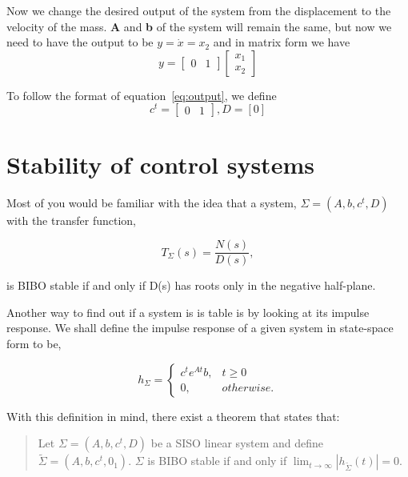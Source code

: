 \medskip Now we change the desired output of the system from the displacement to the velocity of the mass.  \textbf{A} and \textbf{b} of the system
will remain the same, but now we need to have the output to be
$y=\dot x=x_{2}$ and in matrix form we have
\begin{displaymath}
y=\left[\begin{array}{cc}0&1\end{array}\right]\left[\begin{array}{c}x_{1}\\x_{2}\end{array}\right]
\end{displaymath}

\noindent To follow the format of equation~\ref{eq:output}, we
define
\begin{displaymath}
c^{t}=\left[\begin{array}{cc}0&1\end{array}\right], D=[0]
\end{displaymath}

\section{Stability of control systems}

Most of you would be familiar with the idea that a system,
$\Sigma\mathbf=({A,b,c^{t},D})$ with the transfer function,

\begin{displaymath}
T_{\Sigma}(s)=\frac{N(s)}{D(s)},
\end{displaymath}

\noindent is BIBO stable if and only if D(s) has roots only in the
negative half-plane.

Another way to find out if a system is is table is by looking at
its impulse response.  We shall define the impulse response of a
given system in state-space form to be,

\begin{displaymath}
h_{\Sigma}= \left\{
\begin{array}{cc}c^{t}e^{At}b, &t\geq0\\0,&otherwise.\end{array}\right.
\end{displaymath}

\noindent With this definition in mind, there exist a theorem that
states that:

\begin{quote}

Let $\Sigma\mathbf=({A,b,c^{t},D})$ be a SISO linear system and
define $\tilde{\Sigma}\mathbf=({A,b,c^{t},0_{1}})$. $\Sigma$ is
BIBO stable if and only if $\lim_{t\rightarrow\infty}|
h_{\tilde{\Sigma}}(t)|=0$.
\end{quote}

